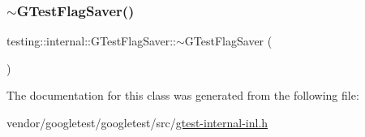 \subsubsection{\texorpdfstring{$\sim$\+G\+Test\+Flag\+Saver()}{~GTestFlagSaver()}}
{\footnotesize\ttfamily testing\+::internal\+::\+G\+Test\+Flag\+Saver\+::$\sim$\+G\+Test\+Flag\+Saver (\begin{DoxyParamCaption}{ }\end{DoxyParamCaption})\hspace{0.3cm}{\ttfamily [inline]}}



The documentation for this class was generated from the following file\+:\begin{DoxyCompactItemize}
\item 
vendor/googletest/googletest/src/\hyperlink{gtest-internal-inl_8h}{gtest-\/internal-\/inl.\+h}\end{DoxyCompactItemize}
